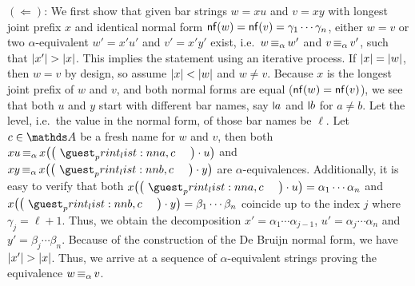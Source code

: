 \documentclass[a4paper,UKenglish,cleveref,autoref,thm-restate,numberwithinsect,final]{lipics-v2021}
\begin{document}
        \noindent $(\Leftarrow)$: We first show that given bar strings $w = xu$ and $v = xy$
        with longest joint prefix $x$ and identical normal form
        $\mathsf{nf}(w) = \mathsf{nf}(v) = \gamma_1 \cdots \gamma_n$, either $w = v$ or two
        $\alpha$-equivalent $w' = x'u'$ and $v' = x'y'$ exist, i.e.~$w \operatorname{\equiv_{\alpha}} w'$ and
        $v \operatorname{\equiv_{\alpha}} v'$, such that $\abs{x'} > \abs{x}$.  This implies the statement using
        an iterative process. If $\abs{x} = \abs{w}$, then $w = v$ by design, so assume
        $\abs{x} < \abs{w}$ and $w \neq v$. Because $x$ is the longest joint prefix of $w$ and
        $v$, and both normal forms are equal ($\mathsf{nf}(w) = \mathsf{nf}(v)$), we see that both $u$ and $y$
        start with different bar names, say $\newletter{a}$ and $\newletter{b}$ for $a \neq
        b$. Let the level, i.e.~the value in the normal form, of those bar names be
        $\ell$. Let $c \in \names$ be a fresh name for $w$ and $v$, then both
        $xu \alphaequiv x \left(\makecycle{a,c}\cdot u\right)$ and
        $xy \alphaequiv x \left(\makecycle{b,c}\cdot y\right)$ are $\alpha$-equivalences.
        Additionally, it is easy to verify that both
        $x \left(\makecycle{a,c}\cdot u\right) = \alpha_1 \cdots \alpha_n$ and
        $x \left(\makecycle{b,c}\cdot y\right) = \beta_1 \cdots \beta_n$ coincide up to the
        index $j$ where $\gamma_j = \ell + 1$. Thus, we obtain the decomposition
        $x' = \alpha_1 \cdots \alpha_{j - 1}$, $u' = \alpha_j \cdots \alpha_n$ and
        $y' = \beta_j \cdots \beta_n$. Because of the construction of the De Bruijn normal
        form, we have $\abs{x'} > \abs{x}$. Thus, we arrive at a sequence of $\alpha$-equivalent
        strings proving the equivalence $w \operatorname{\equiv_{\alpha}} v$.
\end{document}
